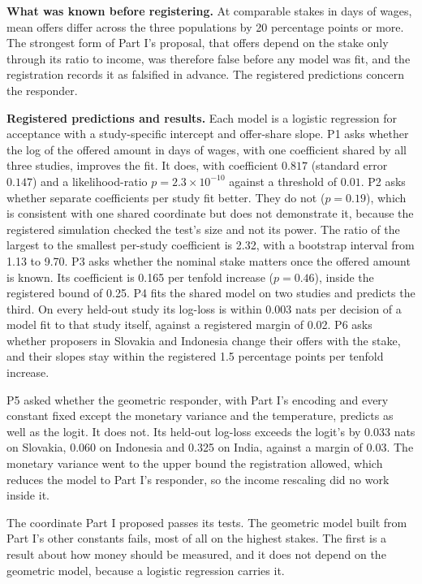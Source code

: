 \documentclass[journal]{IEEEtran}
\begin{document}
\textbf{What was known before registering.}
At comparable stakes in days of wages, mean offers differ across the three populations by 20 percentage points or more.
The strongest form of Part I's proposal, that offers depend on the stake only through its ratio to income, was therefore false before any model was fit, and the registration records it as falsified in advance.
The registered predictions concern the responder.

\textbf{Registered predictions and results.}
Each model is a logistic regression for acceptance with a study-specific intercept and offer-share slope.
P1 asks whether the log of the offered amount in days of wages, with one coefficient shared by all three studies, improves the fit.
It does, with coefficient $0.817$ (standard error $0.147$) and a likelihood-ratio $p=2.3\times10^{-10}$ against a threshold of $0.01$.
P2 asks whether separate coefficients per study fit better.
They do not ($p=0.19$), which is consistent with one shared coordinate but does not demonstrate it, because the registered simulation checked the test's size and not its power.
The ratio of the largest to the smallest per-study coefficient is 2.32, with a bootstrap interval from 1.13 to 9.70.
P3 asks whether the nominal stake matters once the offered amount is known.
Its coefficient is 0.165 per tenfold increase ($p=0.46$), inside the registered bound of 0.25.
P4 fits the shared model on two studies and predicts the third.
On every held-out study its log-loss is within 0.003 nats per decision of a model fit to that study itself, against a registered margin of 0.02.
P6 asks whether proposers in Slovakia and Indonesia change their offers with the stake, and their slopes stay within the registered 1.5 percentage points per tenfold increase.

P5 asked whether the geometric responder, with Part I's encoding and every constant fixed except the monetary variance and the temperature, predicts as well as the logit.
It does not.
Its held-out log-loss exceeds the logit's by 0.033 nats on Slovakia, 0.060 on Indonesia and 0.325 on India, against a margin of 0.03.
The monetary variance went to the upper bound the registration allowed, which reduces the model to Part I's responder, so the income rescaling did no work inside it.

The coordinate Part I proposed passes its tests.
The geometric model built from Part I's other constants fails, most of all on the highest stakes.
The first is a result about how money should be measured, and it does not depend on the geometric model, because a logistic regression carries it.
\end{document}
